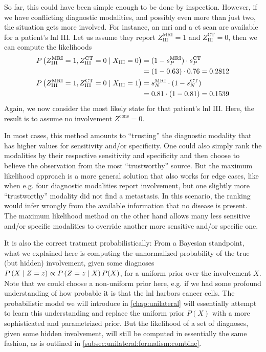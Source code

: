 \documentclass[\relativeRoot/main.tex]{subfiles}
\begin{document}
So far, this could have been simple enough to be done by inspection. However, if we have conflicting diagnostic modalities, and possibly even more than just two, the situation gets more involved. For instance, an \gls{mri} and a \gls{ct} scan are available for a patient's \gls{lnl} III. Let us assume they report $Z_\text{III}^\text{MRI} = 1$ and $Z_\text{III}^\text{CT} = 0$, then we can compute the likelihoods
%
\begin{equation}
    \begin{aligned}
        P \left( Z_\text{III}^\text{MRI} = 1, Z_\text{III}^\text{CT} = 0 \mid X_\text{III} = 0 \right)
        &= (1 - s^\text{MRI}_P) \cdot s^\text{CT}_P \\
        &= (1 - 0.63) \cdot 0.76 = 0.2812 \\
        P \left( Z_\text{III}^\text{MRI} = 1, Z_\text{III}^\text{CT} = 0 \mid X_\text{III} = 1 \right)
        &= s^\text{MRI}_N \cdot (1 - s^\text{CT}_N) \\
        &= 0.81 \cdot (1 - 0.81) = 0.1539
    \end{aligned}
\end{equation}
%
Again, we now consider the most likely state for that patient's \gls{lnl} III. Here, the result is to assume no involvement $Z^\text{cons}=0$.

In most cases, this method amounts to ``trusting'' the diagnostic modality that has higher values for sensitivity and/or specificity. One could also simply rank the modalities by their respective sensitivity and specificity and then choose to believe the observation from the most ``trustworthy'' source. But the maximum likelihood approach is a more general solution that also works for edge cases, like when e.g. four diagnostic modalities report involvement, but one slightly more ``trustworthy'' modality did not find a metastasis. In this scenario, the ranking would infer wrongly  from the available information that no disease is present. The maximum likelihood method on the other hand allows many less sensitive and/or specific modalities to override another more sensitive and/or specific one.

It is also the correct tratment probabilistically: From a Bayesian standpoint, what we explained here is computing the unnormalized probability of the true (but hidden) involvement, given some diagnoses $P \left( X \mid Z=z \right) \propto P \left( Z=z \mid X \right) P(X)$, for a uniform prior over the involvement $X$. Note that we could choose a non-uniform prior here, e.g. if we had some profound understanding of how probable it is that the \gls{lnl} harbors cancer cells. The probabilistic model we will introduce in \cref{chap:unilateral} will essentially attempt to learn this understanding and replace the uniform prior $P(X)$ with a more sophisticated and parametrized prior. But the likelihood of a set of diagnoses, given some hidden involvement, will still be computed in essentially the same fashion, as is outlined in \cref{subsec:unilateral:formalism:combine}.
\end{document}
